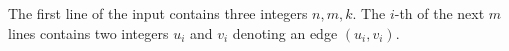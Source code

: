 The first line of the input contains three integers $n,m,k$.
The $i$-th of the next $m$ lines contains two integers $u_i$ and $v_i$ denoting an edge $(u_i,v_i)$.
